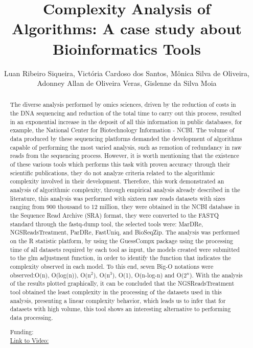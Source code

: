 \documentclass[twoside]{article}
\title{\vspace{-15mm}\fontsize{24pt}{10pt}\selectfont\textbf{ Complexity Analysis of Algorithms: A case study about Bioinformatics Tools }} %
\author{ Luan Ribeiro Siqueira,  Vict\'oria Cardoso dos Santos,  M\^onica Silva de Oliveira,  Adonney Allan de Oliveira Veras,  Gislenne da Silva Moia }
\affil{ UNIVERSIDADE FEDERAL DO PAR\'A }
\date{}
\begin{document}
  
  
  \maketitle %
  
  
  \thispagestyle{fancy} %
  
  
  \begin{abstract}
  The diverse analysis performed by omics sciences,  driven by the reduction of costs in the DNA sequencing and reduction of the total time to carry out this process,  resulted in an exponential increase in the deposit of all this information in public databases,  for example,  the National Center for Biotechnology Information - NCBI. The volume of data produced by these sequencing platforms demanded the development of algorithms capable of performing the most varied analysis,  such as remotion of redundancy in raw reads from the sequencing process. However,  it is worth mentioning that the existence of these various tools which performs this task with proven accuracy through their scientific publications,  they do not analyze criteria related to the algorithmic complexity involved in their development. Therefore,  this work demonstrated an analysis of algorithmic complexity,  through empirical analysis already described in the literature,  this analysis was performed with sixteen raw reads datasets with sizes ranging from 900 thousand to 12 million,  they were obtained in the NCBI database in the Sequence Read Archive (SRA) format,  they were converted to the FASTQ standard through the fastq-dump tool,  the selected tools were: MarDRe,  NGSReadsTreatment,  ParDRe,  FastUniq,  and BioSeqZip. The analysis was performed on the R statistic platform,  by using the GuessCompx package using the processing time of all datasets required by each tool as input,  the models created were submitted to the glm adjustment function,  in order to identify the function that indicates the complexity observed in each model. To this end,  seven Big-O notations were observed:O(n),  O(log(n)),  O(n$^2$),  O(n$^3$),  O(1),  O(n-log-n) and O(2$^n$). With the analysis of the results plotted graphically,  it can be concluded that the NGSReadsTreatment tool obtained the least complexity in the processing of the datasets used in this analysis,  presenting a linear complexity behavior,  which leads us to infer that for datasets with high volume,  this tool shows an interesting alternative to performing data processing.
  
  Funding:   \\
  \href{http://ab3c.org.br/xpress_pres2020/xmxp2020-297674.html}{Link to Video:}

  \end{abstract}
   
  
\end{document}
